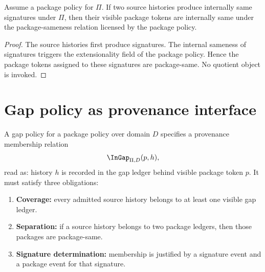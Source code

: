 \begin{theorem}
\label{thm:package-tokens-are-signature-facing}
Assume a package policy for \(\Pi\). If two source histories produce internally same signatures under \(\Pi\), then their visible package tokens are internally same under the package-sameness relation licensed by the package policy.
\end{theorem}

\begin{proof}
The source histories first produce signatures. The internal sameness of signatures triggers the extensionality field of the package policy. Hence the package tokens assigned to these signatures are package-same. No quotient object is invoked.
\end{proof}

\section{Gap policy as provenance interface}

\begin{definition}
\label{def:gap-policy-provenance-interface}
A gap policy for a package policy over domain \(D\) specifies a provenance membership relation
$$
  \InGap_{\Pi,D}(p,h),
$$
read as: history \(h\) is recorded in the gap ledger behind visible package token \(p\).
It must satisfy three obligations:
\begin{enumerate}
  \item \textbf{Coverage:} every admitted source history belongs to at least one visible gap ledger.
  \item \textbf{Separation:} if a source history belongs to two package ledgers, then those packages are package-same.
  \item \textbf{Signature determination:} membership is justified by a signature event and a package event for that signature.
\end{enumerate}
\end{definition}

